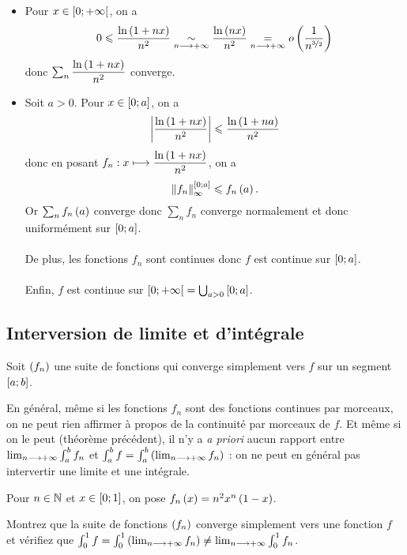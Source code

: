 \begin{corr}
\begin{itemize}
    \item Pour \(x\in\left[0;+\infty\right[\), on a \[0\leqslant\dfrac{\ln\left(1+nx\right)}{n^2}\underset{n\longrightarrow+\infty}{\sim}\dfrac{\ln\left(nx\right)}{n^2}\underset{n\longrightarrow+\infty}{=}o\left(\dfrac{1}{n^{\nicefrac{3}{2}}}\right)\] donc \(\sum_n\dfrac{\ln\left(1+nx\right)}{n^2}\) converge. \\
    \item Soit \(a>0\). Pour \(x\in\left[0;a\right]\), on a \[\left\lvert\dfrac{\ln\left(1+nx\right)}{n^2}\right\rvert\leqslant\dfrac{\ln\left(1+na\right)}{n^2}\] donc en posant \(f_n:x\longmapsto\dfrac{\ln\left(1+nx\right)}{n^2}\), on a \[\norme{f_n}_\infty^{\intervii{0}{a}}\leq f_n\paren{a}.\] Or \(\sum_nf_n\left(a\right)\) converge donc \(\sum_nf_n\) converge normalement et donc uniformément sur \(\left[0;a\right]\). \\\\ De plus, les fonctions \(f_n\) sont continues donc \(f\) est continue sur \(\left[0;a\right]\). \\\\ Enfin, \(f\) est continue sur \(\left[0;+\infty\right[=\bigcup_{a>0}\left[0;a\right]\).
\end{itemize}
\end{corr}

\subsection{Interversion de limite et d'intégrale}

Soit \(\left(f_n\right)\) une suite de fonctions qui converge simplement vers \(f\) sur un segment \(\left[a;b\right]\).

En général, même si les fonctions \(f_n\) sont des fonctions continues par morceaux, on ne peut rien affirmer à propos de la continuité par morceaux de \(f\). Et même si on le peut (\cf théorème précédent), il n'y a \textit{a priori} aucun rapport entre \(\lim_{n\longrightarrow+\infty}\int_a^bf_n\) et \(\int_a^bf=\int_a^b\left(\lim_{n\longrightarrow+\infty}f_n\right)\) : on ne peut en général pas intervertir une limite et une intégrale.

\begin{exo}
Pour \(n\in\mathbb{N}\) et \(x\in\left[0;1\right]\), on pose \(f_n\left(x\right)=n^2x^n\left(1-x\right)\).

Montrez que la suite de fonctions \(\left(f_n\right)\) converge simplement vers une fonction \(f\) et vérifiez que \(\int_0^1f=\int_0^1\left(\lim_{n\longrightarrow+\infty}f_n\right)\not=\lim_{n\longrightarrow+\infty}\int_0^1f_n\).
\end{exo}

